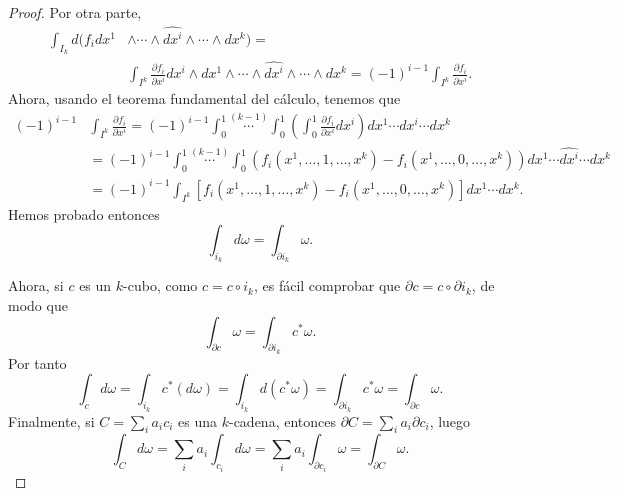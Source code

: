 \documentclass[12pt,a4paper]{book}
\theoremstyle{definition} \newtheorem{defn}[thm]{Definición}
\theoremstyle{definition} \newtheorem{ejemplo}[thm]{Ejemplo}
\theoremstyle{definition} \newtheorem{ejercicio}[thm]{Ejercicio}
\theoremstyle{remark} \newtheorem*{obs}{Observación}
\begin{document}
\begin{proof}
	    Por otra parte, 
	    \begin{align*}
	      \int_{I_k} d(f_i dx^1 & \wedge \cdots \wedge \hat{dx^i} \wedge \cdots \wedge dx^k) =  \\ & \int_{I^k} \frac{\partial f_i}{\partial x^i} dx^i \wedge dx^1 \wedge \cdots \wedge \hat{dx^i} \wedge \cdots \wedge dx^k = (-1)^{i-1}\int_{I^k}\frac{\partial f_i}{\partial x^i}.
	    \end{align*}
	    Ahora, usando el teorema fundamental del cálculo, tenemos que
	    \begin{align*}
	      (-1)^{i-1}&\int_{I^k}  \frac{\partial f_i}{\partial x^i}= (-1)^{i-1}\int_0^1 \overset{(k-1)}{\cdots} \int_0^1 \left(\int_0^1 \frac{\partial f_i}{\partial x^i} dx^i \right) dx^1\cdots \hat{dx^i} \cdots dx^k \\
&= (-1)^{i-1}\int_0^1 \overset{(k-1)}{\cdots} \int_0^1 \left(f_i(x^1,\dots,1,\dots,x^k)-f_i(x^1,\dots,0,\dots,x^k) \right) dx^1\cdots \hat{dx^i} \cdots dx^k \\
&=(-1)^{i-1}  \int_{I^k} [f_i (x^1,\dots,1,\dots,x^k)- f_i(x^1,\dots,0,\dots,x^k)]dx^1\cdots dx^k .
	    \end{align*}
	    Hemos probado entonces
	    \begin{equation*}
	      \int_{i_k} d\omega = \int_{\partial i_k} \omega.
	    \end{equation*}

	    Ahora, si $c$ es un $k$-cubo, como $c=c\circ i_k$, es fácil comprobar que $\partial c= c \circ  \partial i_k$, de modo que
	    \begin{equation*}
	      \int_{\partial c} \omega = \int_{\partial i_k} c^* \omega.
	    \end{equation*}
	    Por tanto
	    \begin{equation*}
	      \int_c d\omega = \int_{i_k} c^* (d\omega) = \int_{i_k} d(c^*\omega)=\int_{\partial i_k} c^*\omega = \int_{\partial c} \omega.
	    \end{equation*}
	    Finalmente, si $C=\sum_i a_i c_i$ es una $k$-cadena, entonces $\partial C=\sum_i a_i \partial c_i$, luego 
	    \begin{equation*}
	      \int_C d\omega = \sum_i a_i \int_{c_i} d\omega = \sum_i a_i \int_{\partial c_i} \omega = \int_{\partial C} \omega.
	    \end{equation*}
	  \end{proof}
\end{document}
